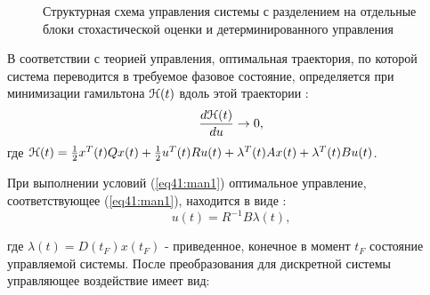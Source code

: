 \begin{figure}[!h]

\centering
{} 
\caption{Структурная схема управления системы с разделением на отдельные блоки стохастической оценки и детерминированного управления}
\label{fig:man_stat}
\end{figure}

В соответствии с теорией управления, оптимальная траектория, по которой система переводится в требуемое фазовое состояние, определяется при минимизации гамильтона $\EuScript{H}(t)$ вдоль этой траектории \cite{popovski}:
\begin{equation}\label{eq41:man1}
\frac{d\EuScript{H}(t)}{du}\rightarrow0,
\end{equation}
\noindent где $\EuScript{H}(t)=\frac{1}{2}x^T(t)Qx(t)+\frac{1}{2}u^T(t)Ru(t)+\lambda^T(t)Ax(t)+\lambda^T(t)Bu(t)$.

При выполнении условий (\ref{eq41:man1}) оптимальное управление, соответствующее (\ref{eq41:man1}), находится в виде \cite{popovski}:
\begin{equation}\label{eq41:man2}
u(t)=R^{-1}B\lambda(t),
\end{equation}

\noindent где $\lambda (t)=D(t_F)x(t_F)$ - приведенное, конечное в момент $t_F$ состояние управляемой системы.
После преобразования для дискретной системы управляющее воздействие имеет вид:

